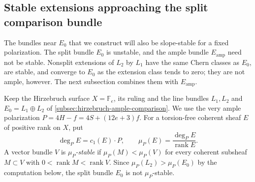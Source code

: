 \subsection{Stable extensions approaching the split comparison bundle}
\label{subsec:hirzebruch-stable-extensions}

The bundles near $E_0$ that we construct will also be slope-stable for a fixed polarization. The split bundle $E_0$ is unstable, and the ample bundle $E_{\mathrm{amp}}$ need not be stable. Nonsplit extensions of $L_2$ by $L_1$ have the same Chern classes as $E_0$, are stable, and converge to $E_0$ as the extension class tends to zero; they are not ample, however. The next subsection combines them with $E_{\mathrm{amp}}$.

Keep the Hirzebruch surface $X=\mathbb F_e$, its ruling and the line bundles $L_1,L_2$ and $E_0=L_1\oplus L_2$ of \cref{subsec:hirzebruch-ample-comparison}. We use the very ample polarization $P=4H-f=4S+(12e+3)f$. For a torsion-free coherent sheaf $E$ of positive rank on $X$, put
\[
 \deg_PE=c_1(E)\cdot P,
 \qquad \mu_P(E)=\frac{\deg_PE}{\operatorname{rank}E}.
\]
A vector bundle $V$ is \emph{$\mu_P$-stable} if $\mu_P(M)<\mu_P(V)$ for every coherent subsheaf $M\subset V$ with $0<\operatorname{rank}M<\operatorname{rank}V$. Since $\mu_P(L_2)>\mu_P(E_0)$ by the computation below, the split bundle $E_0$ is not $\mu_P$-stable.

